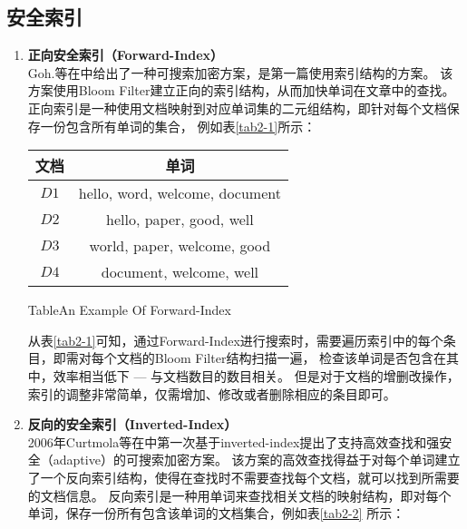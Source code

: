 \subsection{\textbf{安全索引}}
\label{sec:search_symm_secure_index}
\begin{enumerate}
  \item \textbf{正向安全索引（Forward-Index）}\\
  Goh.等在\cite{goh2003secure}中给出了一种可搜索加密方案，是第一篇使用索引结构的方案。
  该方案使用Bloom Filter\cite{gremillion1982designing}建立正向的索引结构，从而加快单词在文章中的查找。
  正向索引是一种使用文档映射到对应单词集的二元组结构，即针对每个文档保存一份包含所有单词的集合，
  例如表\ref{tab2-1}所示：

  \begin{table}[!hbt]
  \centering
  \begin{tabular}[t]{|c|c|}
  \hline
    文档 &       单词 \\
    \hline
    $D1$ & hello, word, welcome, document \\
    \hline
    $D2$ & hello, paper, good, well \\
    \hline
    $D3$ & world, paper, welcome, good \\
    \hline
    $D4$ & document, welcome, well  \\
    \hline
  \end{tabular}
   {Table}{An Example Of Forward-Index}
  \end{table}

  从表\ref{tab2-1}可知，通过Forward-Index进行搜索时，需要遍历索引中的每个条目，即需对每个文档的Bloom Filter结构扫描一遍，
  检查该单词是否包含在其中，效率相当低下 --- 与文档数目的数目相关。
  但是对于文档的增删改操作，索引的调整非常简单，仅需增加、修改或者删除相应的条目即可。



  \item \textbf{反向的安全索引（Inverted-Index）}\\
  2006年Curtmola等在\cite{curtmola2006searchable}中第一次基于inverted-index提出了支持高效查找和强安全（adaptive）的可搜索加密方案。
  该方案的高效查找得益于对每个单词建立了一个反向索引结构，使得在查找时不需要查找每个文档，就可以找到所需要的文档信息。
  反向索引是一种用单词来查找相关文档的映射结构，即对每个单词，保存一份所有包含该单词的文档集合，例如表\ref{tab2-2} 所示：


\end{enumerate}
